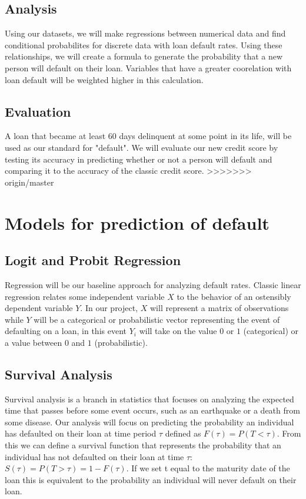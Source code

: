 \documentclass[sigconf, 11pt]{acmart}
\begin{document}
\subsection{Analysis}
Using our datasets, we will make regressions between numerical data and find conditional probabilites for discrete data with loan default rates. Using these relationships, we will create a formula to generate the probability that a new person will default on their loan. Variables that have a greater coorelation with loan default will be weighted higher in this calculation.

\subsection{Evaluation}
A loan that became at least 60 days delinquent at some point in its life, will be used as our standard for "default". We will evaluate our new credit score by testing its accuracy in predicting whether or not a person will default and comparing it to the accuracy of the classic credit score.
>>>>>>> origin/master

\section{Models for prediction of default}
\subsection{Logit and Probit Regression}
Regression will be our baseline approach for analyzing default rates. Classic linear regression relates some independent variable $X$ to the behavior of an ostensibly dependent variable $Y$. In our project, $X$ will represent a matrix of observations while $Y$ will be a categorical or probabilistic vector representing the event of defaulting on a loan, in this event $Y_i$ will take on the value $0$ or $1$ (categorical) or a value between $0$ and $1$ (probabilistic).
\subsection{Survival Analysis}
Survival analysis is a branch in statistics that focuses on analyzing the expected time that passes before some event occurs, such as an earthquake or a death from some disease. Our analysis will focus on predicting the probability an individual has defaulted on their loan at time period $\tau$ defined as $F(\tau) = P(T<\tau)$. From this we can define a survival function that represents the probability that an individual has not defaulted on their loan at time $\tau$: $S(\tau) = P(T>\tau) = 1-F(\tau)$. If we set t equal to the maturity date of the loan this is equivalent to the probability an individual will never default on their loan.
\end{document}
